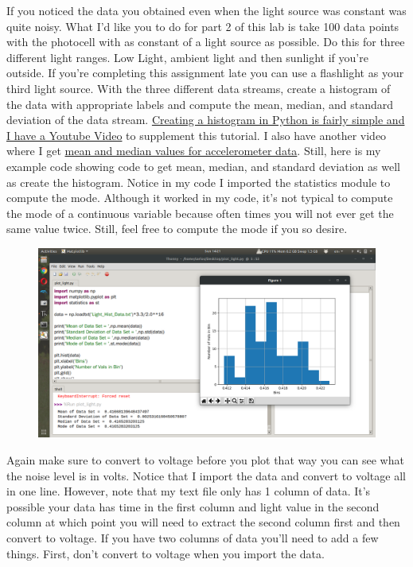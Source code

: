 If you noticed the data you obtained even when the light source was
constant was quite noisy. What I’d like you to do for part 2 of this
lab is take 100 data points with the photocell with as constant of a
light source as possible. Do this for three different light
ranges. Low Light, ambient light and then sunlight if you're
outside. If you're completing this assignment late you can use a
flashlight as your third light source. With the three
different data streams, create a histogram of the data with
appropriate labels and compute the mean, median, and standard
deviation of the data
stream. \href{https://www.youtube.com/watch?v=bfeJfAWTqzY&list=PL_D7_GvGz-v1RsDs_OdNW65qRjEjmpfQx&index=22&t=0s}{Creating
a histogram in Python is fairly simple and I have a Youtube Video} to
supplement this tutorial. I also have another video where I
get \href{https://www.youtube.com/watch?v=e4xs9Ky7_YI&list=PL_D7_GvGz-v1RsDs_OdNW65qRjEjmpfQx&index=20&t=0s}{mean
and median values for accelerometer data}. Still, here is my example
code showing code to get mean, median, and standard deviation as well
as create the histogram. Notice in my code I imported the statistics
module to compute the mode. Although it worked in my code, it’s not
typical to compute the mode of a continuous variable because often
times you will not ever get the same value twice. Still, feel free to
compute the mode if you so desire. 
\begin{figure}[H]
  \begin{center}
    \includegraphics[width=\textwidth]{Figures/histogram.png}
  \end{center}
\end{figure}
Again make sure to convert to voltage before you plot that way you can see what the noise level is in volts. Notice that I import the data and convert to voltage all in one line. However, note that my text file only has 1 column of data. It’s possible your data has time in the first column and light value in the second column at which point you will need to extract the second column first and then convert to voltage. If you have two columns of data you’ll need to add a few things. First, don’t convert to voltage when you import the data.
